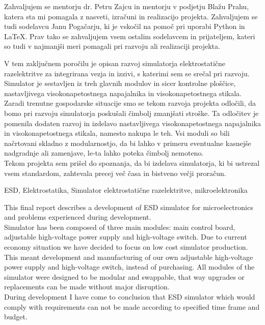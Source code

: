 \documentclass[a4paper,twoside,openright,12pt,Slovene]{book}
\date{Ljubljana, \the\year}
\begin{document}
\frontmatter


\maketitle

\zahvala
Zahvaljujem se mentorju dr. Petru Zajcu in mentorju v podjetju Blažu Prahu, katera sta mi pomagala z nasveti, izračuni in realizacijo projekta. Zahvaljujem se tudi sodelavcu Janu Pogačarju, ki je vskočil na pomoč pri uporabi Python in LaTeX. Prav tako se zahvaljujem vsem ostalim sodelavcem in prijateljem, kateri so tudi v najmanjši meri pomagali pri razvoju ali realizaciji projekta.


\povzetek
V tem zaključnem poročilu je opisan razvoj simulatorja elektrostatične razelektritve za integrirana vezja in izzivi, s katerimi sem se srečal pri razvoju. 
~\\Simulator je sestavljen iz treh glavnih modulov in sicer kontrolne ploščice, nastavljivega visokonapetostnega napajalnika in visokonapetostnega stikala.
Zaradi trenutne gospodarske situacije smo se tekom razvoja projekta odločili, da bomo pri razvoju simulatorja poskušali čimbolj zmanjšati stroške. Ta odločitev je pomenila dodaten razvoj in izdelavo nastavljivega visokonapetostnega napajalnika in visokonapetostnega stikala, namesto nakupa le teh. 
Vsi moduli so bili načrtovani skladno z modularnostjo, da bi lahko v primeru eventualne kasnejše nadgradnje ali zamenjave, le-ta lahko poteka čimbolj nemoteno. 
~\\Tekom projekta sem prišel do spoznanja, da bi izdelava simulatorja, ki bi ustrezal vsem standardom, zahtevala precej več časa in bistveno večji proračun.

\kljucnebesede
ESD, Elektrostatika, Simulator elektrostatične razelektritve, mikroelektronika



\abstract
This final report describes a development of ESD simulator for microelectronics and problems experienced during development. 
~\\Simulator has been composed of three main modules: main control board, adjustable high-voltage power supply and high-voltage switch. Due to current economy situation we have decided to focus on low cost simulator production. This meant development and manufacturing of our own adjustable high-voltage power supply and high-voltage switch, instead of purchasing. All modules of the simulator were designed to be modular and swappable, that way upgrades or replacements can be made without major disruption. 
~\\During development I have come to conclusion that ESD simulator which would comply with requirements can not be made according to specified time frame and budget.
\end{document}
